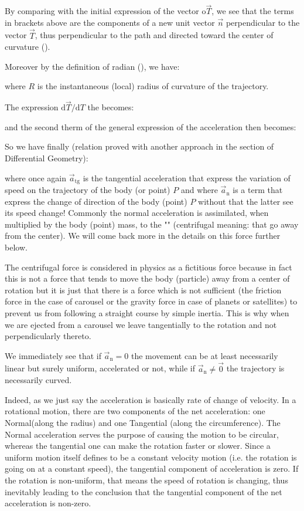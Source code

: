 	By comparing with the initial expression of the vector o$\vec{T}$, we see that the terms in brackets above are the components of a new unit vector $\vec{n}$ perpendicular  to the vector $\vec{T}$, thus perpendicular to the path and directed toward the center of curvature ().

	Moreover by the definition of radian (), we have:
	
	where $R$ is the instantaneous (local) radius of curvature of the trajectory.	
	
	The expression $\mathrm{d}\vec{T}/\mathrm{d}T$ the becomes:
	
	and the second therm of the general expression of the acceleration then becomes:
	
	So we have finally (relation proved with another approach in the section of Differential Geometry):
	
	where once again $\vec{a}_\text{tg}$ is the tangential acceleration that express the variation of speed on the trajectory of the body (or point) $P$ and where  $\vec{a}_\text{n}$ is a term that express the change of direction of the body (point) $P$ without that the latter see its speed change! Commonly the normal acceleration is assimilated, when multiplied by the body (point) mass, to the "" (centrifugal meaning: that go away from the center). We will come back more in the details on this force further below. 
	\begin{tcolorbox}[title=Remark,colframe=black,arc=10pt]
	The centrifugal force is considered in physics as a fictitious force because in fact this is not a force that tends to move the body (particle) away from a center of rotation but it is just that there is a force which is not sufficient (the friction force in the case of carousel or the gravity force in case of planets or satellites) to prevent us from following a straight course by simple inertia. This is why when we are ejected from a carousel we leave tangentially to the rotation and not perpendicularly thereto.
	\end{tcolorbox}
	We immediately see that if $\vec{a}_\text{n}=0$ the movement can be at least necessarily linear but surely uniform, accelerated or not, while if $\vec{a}_\text{n}\neq \vec{0}$ the trajectory is necessarily curved.
	
	Indeed, as we just say the acceleration is basically rate of change of velocity. In a rotational motion, there are two components of the net acceleration: one Normal(along the radius) and one Tangential (along the circumference). The Normal acceleration serves the purpose of causing the motion to be circular, whereas the tangential one can make the rotation faster or slower. Since a uniform motion itself defines to be a constant velocity motion (i.e. the rotation is going on at a constant speed), the tangential component of acceleration is zero. If the rotation is non-uniform, that means the speed of rotation is changing, thus inevitably leading to the conclusion that the tangential component of the net acceleration is non-zero.
	
